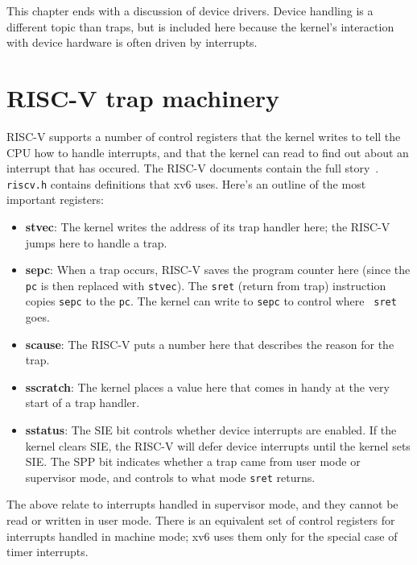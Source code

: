 This chapter ends with a discussion of device drivers. Device handling
is a different topic than traps, but is included here because the
kernel's interaction with device hardware is often driven by
interrupts.

\section{RISC-V trap machinery}

RISC-V supports a number of control registers that the kernel writes to
tell the CPU how to handle interrupts, and that the kernel can read
to find out about an interrupt that has occured. The RISC-V documents
contain the full story~\cite{riscv:priv}. {\tt riscv.h}
 contains definitions that xv6 uses. Here's
an outline of the most important registers:

\begin{itemize}

\item {\bf stvec}: The kernel writes the address of its trap handler
  here; the RISC-V jumps here to handle a trap.

\item {\bf sepc}: When a trap occurs, RISC-V saves the program counter
  here (since the {\tt pc} is then replaced with {\tt stvec}). The
  {\tt sret} (return from trap) instruction copies {\tt sepc} to the
  {\tt pc}. The kernel can write to {\tt sepc} to control where {\tt
    sret} goes.

\item {\bf scause}: The RISC-V puts a number here that describes
the reason for the trap.

\item {\bf sscratch}: The kernel places a value here that comes in
  handy at the very start of a trap handler.

\item {\bf sstatus}: The SIE bit controls whether device interrupts
  are enabled. If the kernel clears SIE, the RISC-V will defer
  device interrupts until the kernel sets SIE. The SPP bit
  indicates whether a trap came from user mode or supervisor
  mode, and controls to what mode {\tt sret} returns.

\end{itemize}

The above relate to interrupts handled in supervisor mode, and they
cannot be read or written in user mode. There is an equivalent set of
control registers for interrupts handled in machine mode; xv6 uses
them only for the special case of timer interrupts.

